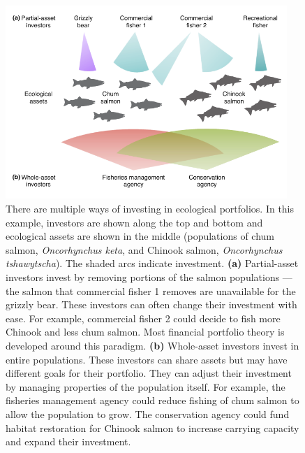 \begin{figure}[htbp]
\centering \includegraphics[width=4.2in]{salmon-portfolios.pdf} \caption{There
  are multiple ways of investing in ecological portfolios. In this example,
  investors are shown along the top and bottom and ecological assets are shown
  in the middle (populations of chum salmon, \textit{Oncorhynchus keta}, and
  Chinook salmon, \textit{Oncorhynchus tshawytscha}). The shaded arcs indicate
  investment. \textbf{(a)} Partial-asset investors invest by removing portions
  of the salmon populations --- the salmon that commercial fisher 1 removes are
  unavailable for the grizzly bear. These investors can often change their
  investment with ease. For example, commercial fisher 2 could decide to fish
  more Chinook and less chum salmon. Most financial portfolio theory is
  developed around this paradigm. \textbf{(b)} Whole-asset investors invest in
  entire populations. These investors can share assets but may have different
  goals for their portfolio. They can adjust their investment by managing
  properties of the population itself. For example, the fisheries management
  agency could reduce fishing of chum salmon to allow the population to grow.
  The conservation agency could fund habitat restoration for Chinook salmon to
  increase carrying capacity and expand their investment.}
\label{fig:salmonport}
\end{figure}

